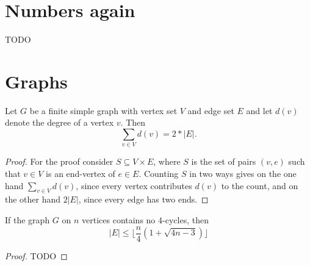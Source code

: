 \section{Numbers again}
 TODO

\section{Graphs}

\begin{lemma}[Handshaking]
  \leanok
  Let $G$ be a finite simple graph with vertex set $V$ and edge set $E$ and let
  $d(v)$ denote the degree of a vertex $v$. Then
  \[
  \sum_{v\in V}d(v) = 2* |E|.
  \]
\end{lemma}
\begin{proof}
\leanok
For the proof consider $S \subseteq V \times E$, where $S$ is
the set of pairs $(v, e)$ such that $v \in V$ is an end-vertex
of $e \in E$. Counting $S$ in two ways gives on the one hand
$\sum_{v \in V} d(v)$, since every vertex contributes $d(v)$
to the count, and on the other hand $2|E|$, since every edge
has two ends.
\end{proof}

\begin{theorem}
  \label{ch28theorem}
  If the graph $G$ on $n$ vertices contains no $4$-cycles, then
  \[
  |E| \le \lfloor\frac{n}{4}(1 + \sqrt{4n - 3})\rfloor
  \]
\end{theorem}
\begin{proof}
  TODO
\end{proof}

